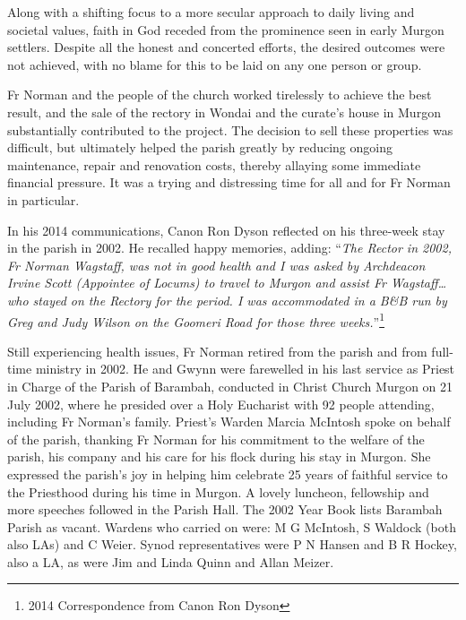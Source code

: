 Along with a shifting focus to a more secular approach to daily living and societal values, faith in God receded from the prominence seen in early Murgon settlers. Despite all the honest and concerted efforts, the desired outcomes were not achieved, with no blame for this to be laid on any one person or group.



Fr Norman and the people of the church worked tirelessly to achieve the best result, and the sale of the rectory in Wondai and the curate's house in Murgon substantially contributed to the project. The decision to sell these properties was difficult, but ultimately helped the parish greatly by reducing ongoing maintenance, repair and renovation costs, thereby allaying some immediate financial pressure. It was a trying and distressing time for all and for Fr Norman in particular.



In his 2014 communications, Canon Ron Dyson reflected on his three-week stay in the parish in 2002. He recalled happy memories, adding: ``\emph{The Rector in 2002, Fr Norman Wagstaff, was not in good health and I was asked by Archdeacon Irvine Scott (Appointee of Locums) to travel to Murgon and assist Fr Wagstaff\ldots who stayed on the Rectory for the period. I was accommodated in a B\&B run by Greg and Judy Wilson on the Goomeri Road for those three weeks.}''\footnote{2014 Correspondence from Canon Ron Dyson}


Still experiencing health issues, Fr Norman retired from the parish and from full-time ministry in 2002. He and Gwynn were farewelled in his last service as Priest in Charge of the Parish of Barambah, conducted in Christ Church Murgon on 21 July 2002, where he presided over a Holy Eucharist with 92 people attending, including Fr Norman's family. Priest's Warden Marcia McIntosh spoke on behalf of the parish, thanking Fr Norman for his commitment to the welfare of the parish, his company and his care for his flock during his stay in Murgon. She expressed the parish's joy in helping him celebrate 25 years of faithful service to the Priesthood during his time in Murgon. A lovely luncheon, fellowship and more speeches followed in the Parish Hall. The 2002 Year Book lists Barambah Parish as vacant. Wardens who carried on were: M G McIntosh, S Waldock (both also LAs) and C Weier. Synod representatives were P N Hansen and B R Hockey, also a LA, as were Jim and Linda Quinn and Allan Meizer.









